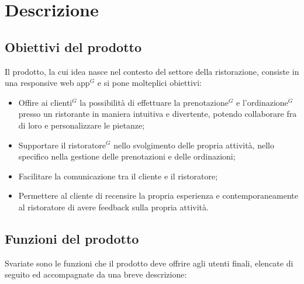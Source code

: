 \section{Descrizione }
\subsection{Obiettivi del prodotto}

Il prodotto, la cui idea nasce nel contesto del settore della ristorazione,
 consiste in una responsive web app$^{G}$ e si pone molteplici obiettivi:
\begin{itemize}
    \item Offire ai clienti$^{G}$ la possibilità di effettuare la prenotazione$^{G}$ e l'ordinazione$^{G}$ presso un ristorante
      in maniera intuitiva e divertente, potendo collaborare fra di loro e personalizzare le pietanze;
    \item Supportare il ristoratore$^{G}$ nello svolgimento delle propria attività, nello specifico nella gestione delle prenotazioni e
    delle ordinazioni;
    \item Facilitare la comunicazione tra il cliente e il ristoratore;
    \item Permettere al cliente di recensire la propria esperienza e contemporaneamente al ristoratore di avere
    feedback sulla propria attività.
\end{itemize}

\subsection{Funzioni del prodotto}

Svariate sono le funzioni che il prodotto deve offrire agli utenti finali,
elencate di seguito ed accompagnate da una breve descrizione:

